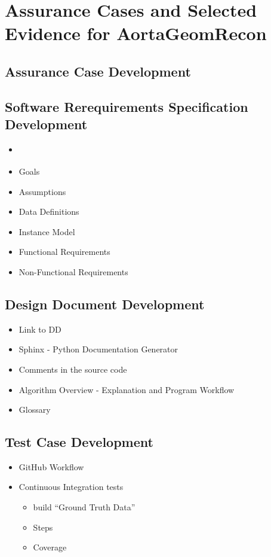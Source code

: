 \chapter{Assurance Cases and Selected Evidence for AortaGeomRecon}

\section{Assurance Case Development}

\section{Software Rerequirements Specification Development}
\begin{itemize}
\item \citep{SRS}
\item Goals
\item Assumptions
\item Data Definitions
\item Instance Model
\item Functional Requirements
\item Non-Functional Requirements
\end{itemize}

\section{Design Document Development}
\begin{itemize}
\item Link to DD
\item Sphinx - Python Documentation Generator
\item Comments in the source code
\item Algorithm Overview - Explanation and Program Workflow
\item Glossary
\end{itemize}

\section{Test Case Development}
\begin{itemize}
\item GitHub Workflow
\item Continuous Integration tests
\begin{itemize}
\item build ``Ground Truth Data''
\item Steps
\item Coverage
\end{itemize}
\end{itemize}

